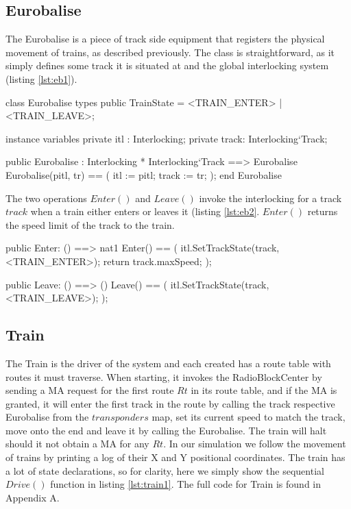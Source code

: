 \documentclass[preprint,12pt]{elsarticle}
\begin{document}
\subsection{Eurobalise}

The Eurobalise is a piece of track side equipment that registers the physical movement of trains, as described previously. The class is straightforward, as it simply defines some track it is situated at and the global interlocking system (listing \ref{lst:eb1}).

\begin{vdmsl}[label=lst:eb1,caption={Types, variables, constructor for the Eurobalise.}]
	class Eurobalise
	types
	public TrainState = <TRAIN_ENTER> | <TRAIN_LEAVE>;

	instance variables
	private itl : Interlocking;
	private track: Interlocking`Track;
	
	public Eurobalise : Interlocking * Interlocking`Track
 	==> Eurobalise
	Eurobalise(pitl, tr) ==
	(
		itl := pitl;
		track := tr;
	);
	end Eurobalise			
\end{vdmsl}

The two operations $Enter()$ and $Leave()$ invoke the interlocking for a track $track$ when a train either enters or leaves it (listing \ref{lst:eb2}. $Enter()$ returns the speed limit of the track to the train.

\begin{vdmsl}[label=lst:eb2,caption={The two operations that trains call to register their movement.}]
	public Enter: () ==> nat1
	Enter() == (
		itl.SetTrackState(track, <TRAIN_ENTER>);
		return track.maxSpeed;
	);
	
	public Leave: () ==> ()
	Leave() == (
		itl.SetTrackState(track, <TRAIN_LEAVE>);
	);	
\end{vdmsl}

\subsection{Train}

The Train is the driver of the system and each created has a route table with routes it must traverse. When starting, it invokes the RadioBlockCenter by sending a MA request for the first route $Rt$ in its route table, and if the MA is granted, it will enter the first track in the route by calling the track respective Eurobalise from the $transponders$ map, set its current speed to match the track, move onto the end and leave it by calling the Eurobalise. The train will halt should it not obtain a MA for any $Rt$. In our simulation we follow the movement of trains by printing a log of their X and Y positional coordinates. The train has a lot of state declarations, so for clarity, here we simply show the sequential $Drive()$ function in listing \ref{lst:train1}. The full code for Train is found in Appendix A.
\end{document}
